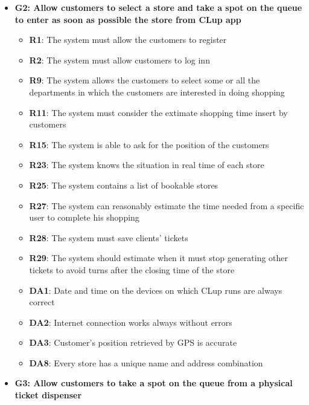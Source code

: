 \documentclass{article}
\begin{document}
\begin{itemize}
\begin{itemize}
					\end{itemize}
				
				\item {\bfseries G2: Allow customers to select a store and take a spot on the queue to enter as soon as possible the store from CLup app}	

					\begin{itemize}
						
						\item {\bfseries R1}: The system must allow the customers to register
						\item {\bfseries R2}: The system must allow customers to log inn
						\item {\bfseries R9}: The system allows the customers to select some or all the departments in which the customers are interested in doing shopping							\item {\bfseries R11}: The system must consider the extimate shopping time insert by customers
						\item {\bfseries R15}: The system is able to ask for the position of the customers
						\item {\bfseries R23}: The system knows the situation in real time of each store
						\item {\bfseries R25}: The system contains a list of bookable stores
						\item {\bfseries R27}: The system can reasonably estimate the time needed from a specific user to complete his shopping
						\item {\bfseries R28}: The system must save clients’ tickets
						\item {\bfseries R29}: The system should estimate when it must stop generating other tickets to avoid turns after the closing time of the store \\
		
						\item {\bfseries DA1}: Date and time on the devices on which CLup runs are always correct
						\item {\bfseries DA2}: Internet connection works always without errors
						\item {\bfseries DA3}: Customer’s position retrieved by GPS is accurate
						\item {\bfseries DA8}: Every store has a unique name and address combination
						
					\end{itemize}

				\item {\bfseries G3: Allow customers to take a spot on the queue from a physical ticket dispenser}	


\end{itemize}
\end{document}
